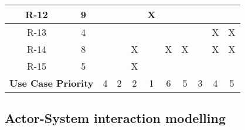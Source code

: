 \documentclass[12pt,a4paper]{article}
\begin{document}
\begin{table}[]
\begin{adjustwidth}{-2cm}{}
\begin{tabular}{cc|c|c|c|c|c|c|c|c|c|}
						\multicolumn{1}{|c|}{R-12}                 & 9                 &     &     &     & X    &     &   &   &   &     						\\ \hline
						\multicolumn{1}{|c|}{R-13}                 & 4                 &     &     &     &      &     &   &   & X & X      						\\ \hline
						\multicolumn{1}{|c|}{R-14}                 & 8                 &     &     & X   &      & X   & X &   & X & X     						\\ \hline
						\multicolumn{1}{|c|}{R-15}                 & 5                 &     &     & X   &      &     &   &   &   &     						\\ \hline
						\multicolumn{2}{|c|}{\textbf{Use Case Priority}}               & 4    & 2    & 2    & 1    & 6    & 5 & 3 & 4  & 5						\\ \hline
					\end{tabular}
				\end{adjustwidth}
			\end{table}
	\subsection{Actor-System interaction modelling}
\end{document}
